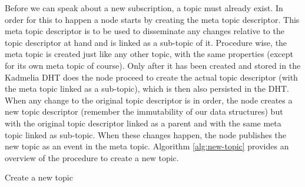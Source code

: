 Before we can speak about a new subscription, a topic must already exist. In
order for this to happen a node starts by creating the meta topic descriptor.
This meta topic descriptor is to be used to disseminate any changes relative to
the topic descriptor at hand and is linked as a sub-topic of it. Procedure
wise, the meta topic is created just like any other topic, with the same
properties (except for its own meta topic of course). Only after it has been
created and stored in the Kadmelia DHT does the node proceed to
create the actual topic descriptor (with the meta topic linked as a sub-topic),
which is then also persisted in the DHT. When any change to the
original topic descriptor is in order, the node creates a new topic descriptor
(remember the immutability of our data structures) but with the original topic
descriptor linked as a parent and with the same meta topic linked as sub-topic.
When these changes happen,  the node publishes the new topic as an event in the
meta topic.  Algorithm \ref{alg:new-topic} provides an overview of the
procedure to create a new topic.


\begin{algorithm}
  \SetAlgoLined
  \caption{Create a new topic}
	\label{alg:new-topic}
\end{algorithm}


